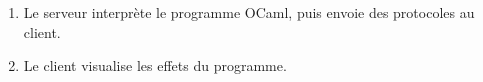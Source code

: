 \documentclass[14px]{article}
\begin{document}
\begin{enumerate}
\begin{figure}[htbp]
{\begin{minipage}[t]{0.4\linewidth}
            \end{minipage}%
        }%
        \centering
    \end{figure}
    \item Le serveur interprète le programme OCaml, puis envoie des protocoles au client.
    \item Le client visualise les effets du programme.
    \begin{figure}[htbp]
        \centering
\end{figure}
\end{enumerate}
\end{document}
